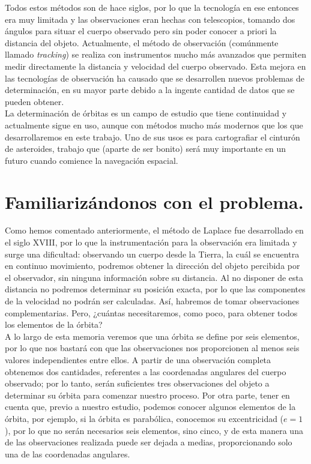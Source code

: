 \documentclass[11pt]{book}
\begin{document}
Todos estos métodos son de hace siglos, por lo que la tecnología en ese entonces era muy limitada y las observaciones eran hechas con telescopios, tomando dos ángulos para situar el cuerpo observado pero sin poder conocer a priori la distancia del objeto. Actualmente, el método de observación (comúnmente llamado \textit{tracking}) se realiza con instrumentos mucho más avanzados que permiten medir directamente la distancia y velocidad del cuerpo observado. Esta mejora en las tecnologías de observación ha causado que se desarrollen nuevos problemas de determinación, en su mayor parte debido a la ingente cantidad de datos que se pueden obtener.\\

La determinación de órbitas es un campo de estudio que tiene continuidad y actualmente sigue en uso, aunque con métodos mucho más modernos que los que desarrollaremos en este trabajo. Uno de sus usos es para cartografiar el cinturón de asteroides, trabajo que (aparte de ser bonito) será muy importante en un futuro cuando comience la navegación espacial.\\


\section{Familiarizándonos con el problema.}
Como hemos comentado anteriormente, el método de Laplace fue desarrollado en el siglo XVIII, por lo que la instrumentación para la observación era limitada y surge una dificultad: observando un cuerpo desde la Tierra, la cuál se encuentra en continuo movimiento, podremos obtener la dirección del objeto percibida por el observador, sin ninguna información sobre su distancia. Al no disponer de esta distancia no podremos determinar su posición exacta, por lo que las componentes de la velocidad no podrán ser calculadas. Así, habremos de tomar observaciones complementarias. Pero, ¿cuántas necesitaremos, como poco, para obtener todos los elementos de la órbita?\\

A lo largo de esta memoria veremos que una órbita se define por seis elementos, por lo que nos bastará con que las observaciones nos proporcionen al menos seis valores independientes entre ellos. A partir de una observación completa obtenemos dos cantidades, referentes a las coordenadas angulares del cuerpo observado; por lo tanto, serán suficientes tres observaciones del objeto a determinar su órbita para comenzar nuestro proceso. Por otra parte, tener en cuenta que, previo a nuestro estudio, podemos conocer algunos elementos de la órbita, por ejemplo, si la órbita es parabólica, conocemos su excentricidad ($e=1$), por lo que no serán necesarios seis elementos, sino cinco, y de esta manera una de las observaciones realizada puede ser dejada a medias, proporcionando solo una de las coordenadas angulares.\\
\end{document}
